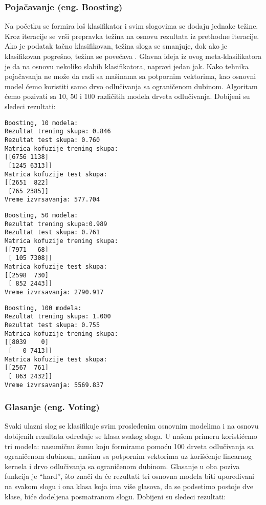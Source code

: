 \documentclass[a4paper]{article}
\begin{document}
\subsubsection{Pojačavanje (eng. Boosting)}
Na početku se formira loš klasifikator i svim slogovima se dodaju jednake težine.
Kroz iteracije se vrši prepravka težina na osnovu rezultata iz prethodne iteracije. Ako je podatak
tačno klasifikovan, težina sloga se smanjuje, dok ako je klasifikovan pogrešno, težina se povećava \cite{Boosting} .
Glavna ideja iz ovog meta-klasifikatora je da na osnovu nekoliko slabih klasifikatora, napravi jedan
jak. Kako tehnika pojačavanja ne može da radi sa mašinama sa potpornim vektorima, kao osnovni
model ćemo koristiti samo drvo odlučivanja sa ograničenom dubinom.
Algoritam ćemo pozivati sa  10, 50 i 100 različitih modela drveta odlučivanja.
Dobijeni su sledeci rezultati:

\begin{tcolorbox}
\begin{verbatim}
Boosting, 10 modela:
Rezultat trening skupa: 0.846
Rezultat test skupa: 0.760
Matrica kofuzije trening skupa:
[[6756 1138]
 [1245 6313]]
Matrica kofuzije test skupa:
[[2651  822]
 [765 2385]]
Vreme izvrsavanja: 577.704
\end{verbatim}
\end{tcolorbox}

\begin{tcolorbox}
\begin{verbatim} 
Boosting, 50 modela:
Rezultat trening skupa:0.989
Rezultat test skupa: 0.761
Matrica kofuzije trening skupa:
[[7971   68]
 [ 105 7308]]
Matrica kofuzije test skupa:
[[2598  730]
 [ 852 2443]]
Vreme izvrsavanja: 2790.917
\end{verbatim}
\end{tcolorbox}

\begin{tcolorbox}
\begin{verbatim}
Boosting, 100 modela:
Rezultat trening skupa: 1.000
Rezultat test skupa: 0.755
Matrica kofuzije trening skupa:
[[8039    0]
 [   0 7413]]
Matrica kofuzije test skupa:
[[2567  761]
 [ 863 2432]]
Vreme izvrsavanja: 5569.837
\end{verbatim}
\end{tcolorbox}

\subsubsection {Glasanje (eng. Voting)}
Svaki ulazni slog se klasifikuje svim prosleđenim osnovnim modelima i na osnovu
dobijenih rezultata određuje se klasa svakog sloga\cite{Voting}. U našem primeru koristićemo tri modela:
nasumičnu šumu koju formiramo pomoću 100 drveta odlučivanja sa ograničenom dubinom,
mašinu sa potpornim vektorima uz korišćenje linearnog kernela i drvo odlučivanja sa
ograničenom dubinom.
Glasanje u oba poziva funkcija je “hard”, što znači da će rezultati tri osnovna modela biti
upoređivani na svakom slogu i ona klasa koja ima više glasova, da se podsetimo postoje dve klase,
biće dodeljena posmatranom slogu.
Dobijeni su sledeci rezultati:
\end{document}
